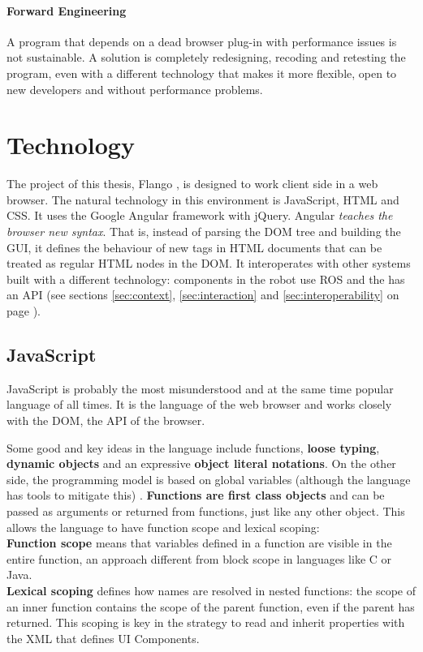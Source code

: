 \paragraph{Forward Engineering} A program that depends on a dead browser plug-in with performance issues is not sustainable.
A solution is completely  redesigning, recoding and retesting the program, even with a different technology that makes it more flexible, open to new developers and without performance problems.

\section{Technology}
The project of this thesis, Flango \cm, is designed to work client side in a web browser.
The natural technology in this environment is JavaScript, \ac{HTML} and \ac{CSS}.
It uses the Google Angular framework with jQuery.
Angular \textit{teaches the browser new syntax}.
That is, instead of parsing the \ac{DOM} tree and building the \ac{GUI}, it defines the behaviour of new tags in \ac{HTML} documents that can be treated as regular \ac{HTML} nodes in the \ac{DOM}.
It interoperates with other systems built with a different technology: components in the robot use \ac{ROS} and the \flangobe has an \ac{API} (see sections \ref{sec:context}, \ref{sec:interaction} and \ref{sec:interoperability} on page \pageref{sec:context}).

\subsection{JavaScript}
JavaScript is probably the most misunderstood and at the same time popular language of all times.
It is the language of the web browser and works closely with the \ac{DOM}, the \ac{API} of the browser.

Some good and key ideas in the language include functions, \textbf{loose typing}, \textbf{dynamic objects} and an expressive \textbf{object literal notations}.
On the other side, the programming model is based on global variables (although the language has tools to mitigate this) \cite{Crockford}.
\textbf{Functions are first class objects} and can be passed as arguments or returned from functions, just like any other object.
This allows the language to have function scope and lexical scoping: \\
\textbf{Function scope} means that variables defined in a function are visible in the entire function, an approach different from block scope in languages like C or Java.\\
\textbf{Lexical scoping} defines how names are resolved in nested functions: the scope of an inner function contains the scope of the parent function, even if the parent has returned.
This scoping is key in the strategy to read and inherit properties with the \ac{XML} that defines UI Components.

